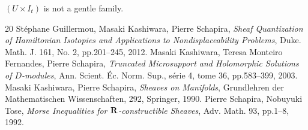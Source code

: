 \begin{Remark+}
  \((U\times I_t)\) is not a gentle family.  
\end{Remark+}


\begin{thebibliography}{20} 
   St\'ephane Guillermou, 
  Masaki Kashiwara, Pierre Schapira, 
  \textit{Sheaf Quantization of Hamiltonian Isotopies and Applications to Nondisplaceability Problems}, 
  Duke. Math. J. 161, No. 2, pp.201--245, 2012.  
   Masaki Kashiwara, Teresa Monteiro Fernandes, Pierre Schapira, 
    \textit{Truncated Microsupport and Holomorphic Solutions 
    of \(D\)-modules}, 
    Ann. Scient. \'Ec. Norm. Sup., s\'erie 4, tome 36, 
    pp.583--399, 2003.
   Masaki Kashiwara, Pierre Schapira, 
    \textit{Sheaves on Manifolds}, 
    Grundlehren der Mathematischen Wissenschaften, 292, Springer, 1990.
   Pierre Schapira, Nobuyuki Tose, 
    \textit{Morse Inequalities for \(\mathbf{R}\)-constructible Sheaves}, 
    Adv. Math. 93, pp.1--8, 1992. 
\end{thebibliography}






